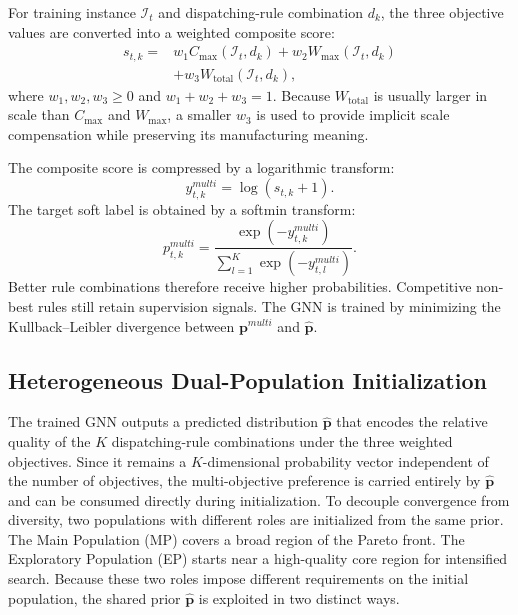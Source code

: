 \documentclass[pdflatex,iicol,Numbered,sn-basic]{sn-jnl}
\begin{document}
For training instance $\mathcal{I}_t$ and dispatching-rule combination $d_k$, the three objective values are converted into a weighted composite score:
\begin{align}
  s_{t,k} =
   & w_1 C_{\max}(\mathcal{I}_t,d_k)
  + w_2 W_{\max}(\mathcal{I}_t,d_k) \nonumber     \\
   & + w_3 W_{\mathrm{total}}(\mathcal{I}_t,d_k),
\end{align}
where $w_1,w_2,w_3\ge0$ and $w_1+w_2+w_3=1$. Because $W_{\mathrm{total}}$ is usually larger in scale than $C_{\max}$ and $W_{\max}$, a smaller $w_3$ is used to provide implicit scale compensation while preserving its manufacturing meaning.

The composite score is compressed by a logarithmic transform:
\begin{equation}
  y_{t,k}^{multi}=\log(s_{t,k}+1).
\end{equation}
The target soft label is obtained by a softmin transform:
\begin{equation}
  p_{t,k}^{multi} =
  \frac{\exp(-y_{t,k}^{multi})}
  {\sum_{l=1}^{K}\exp(-y_{t,l}^{multi})}.
\end{equation}
Better rule combinations therefore receive higher probabilities. Competitive non-best rules still retain supervision signals.
The GNN is trained by minimizing the Kullback--Leibler divergence between $\mathbf{p}^{multi}$ and $\hat{\mathbf{p}}$.

\subsection{Heterogeneous Dual-Population Initialization}\label{subsec:init}

The trained GNN outputs a predicted distribution $\hat{\mathbf{p}}$ that encodes the relative quality of the $K$ dispatching-rule combinations under the three weighted objectives.
Since it remains a $K$-dimensional probability vector independent of the number of objectives, the multi-objective preference is carried entirely by $\hat{\mathbf{p}}$ and can be consumed directly during initialization.
To decouple convergence from diversity, two populations with different roles are initialized from the same prior. The Main Population (MP) covers a broad region of the Pareto front. The Exploratory Population (EP) starts near a high-quality core region for intensified search.
Because these two roles impose different requirements on the initial population, the shared prior $\hat{\mathbf{p}}$ is exploited in two distinct ways.
\end{document}
